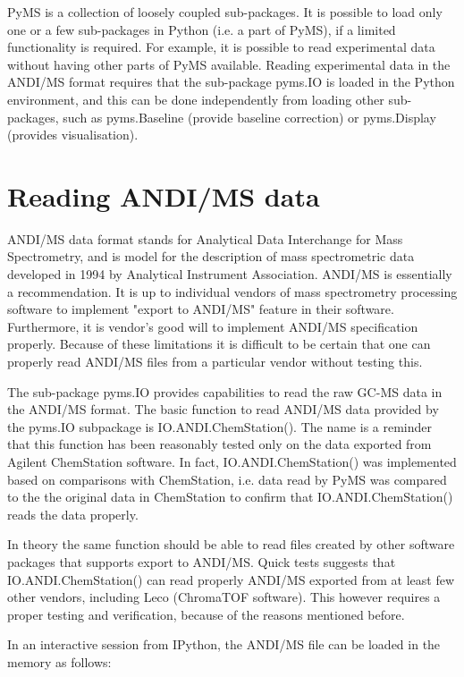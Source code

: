 PyMS is a collection of loosely coupled sub-packages. It is possible
to load only one or a few sub-packages in Python (i.e. a part of PyMS),
if a limited functionality is required. For example, it is possible
to read experimental data without having other parts of PyMS
available. Reading experimental data in the ANDI/MS format requires
that the sub-package pyms.IO is loaded in the Python environment,
and this can be done independently from loading other sub-packages,
such as pyms.Baseline (provide baseline correction) or pyms.Display
(provides visualisation).

\section{Reading ANDI/MS data}

ANDI/MS data format stands for Analytical Data Interchange for Mass
Spectrometry, and is model for the description of mass spectrometric
data developed in 1994 by Analytical Instrument Association. ANDI/MS 
is essentially a recommendation. It is up to individual vendors of
mass spectrometry processing software to implement "export to ANDI/MS"
feature in their software. Furthermore, it is vendor's good will to
implement ANDI/MS specification properly. Because of these limitations
it is difficult to be certain that one can properly read ANDI/MS
files from a particular vendor without testing this.

The sub-package pyms.IO provides capabilities to read the raw GC-MS
data in the ANDI/MS format. The basic function to read ANDI/MS data
provided by the pyms.IO subpackage is IO.ANDI.ChemStation(). The
name is a reminder that this function has been reasonably tested
only on the data exported from Agilent ChemStation software.
In fact, IO.ANDI.ChemStation() was implemented based on comparisons
with ChemStation, i.e. data read by PyMS was compared to the
the original data in ChemStation to confirm that IO.ANDI.ChemStation()
reads the data properly.

In theory the same function should be able to read files created by
other software packages that supports export to ANDI/MS. Quick tests
suggests that IO.ANDI.ChemStation() can read properly ANDI/MS exported
from at least few other vendors, including Leco (ChromaTOF software).
This however requires a proper testing and verification, because of
the reasons mentioned before.
 
In an interactive session from IPython, the ANDI/MS file can be loaded
in the memory as follows:

